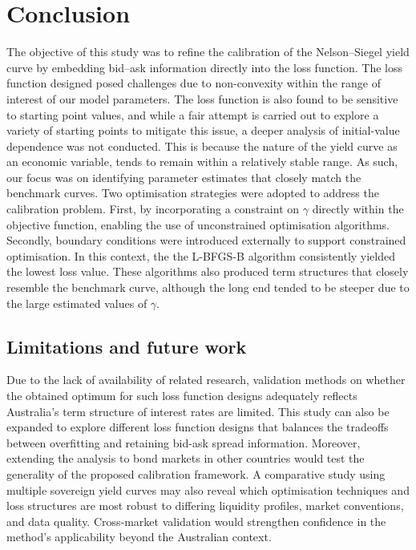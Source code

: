 \documentclass[12pt]{article}
\begin{document}
\section{Conclusion}

The objective of this study was to refine the calibration of the Nelson–Siegel yield curve by embedding bid–ask information directly into the loss function. The loss function designed posed challenges due to non-convexity within the range of interest of our model parameters. The loss function is also found to be sensitive to starting point values, and while a fair attempt is carried out to explore a variety of starting points to mitigate this issue, a deeper analysis of initial-value dependence was not conducted. This is because the nature of the yield curve as an economic variable, tends to remain within a relatively stable range. As such, our focus was on identifying parameter estimates that closely match the benchmark curves. Two optimisation strategies were adopted to address the calibration problem. First, by incorporating a constraint on $\gamma$ directly within the objective function, enabling the use of unconstrained optimisation algorithms. Secondly, boundary conditions were introduced externally to support constrained optimisation. In this context, the the L-BFGS-B algorithm consistently yielded the lowest loss value. These algorithms also produced term structures that closely resemble the benchmark curve, although the long end tended to be steeper due to the large estimated values of $\gamma$.

\subsection{Limitations and future work} 

Due to the lack of availability of related research, validation methods on whether the obtained optimum for such loss function designs adequately reflects Australia's term structure of interest rates are limited. This study can also be expanded to explore different loss function designs that balances the tradeoffs between overfitting and retaining bid-ask spread information. Moreover, extending the analysis to bond markets in other countries would test the generality of the proposed calibration framework. A comparative study using multiple sovereign yield curves may also reveal which optimisation techniques and loss structures are most robust to differing liquidity profiles, market conventions, and data quality. Cross‐market validation would strengthen confidence in the method’s applicability beyond the Australian context.
\end{document}
